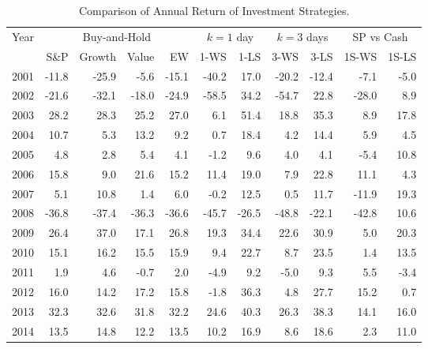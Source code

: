 \documentclass{article}
\begin{document}
\begin{table}[!ht]
    \centering
    \caption{Comparison of Annual Return of Investment Strategies.}
    \medskip
    \begin{tabular}{l | rrrr | rr | rr| rr}
    \hline
\multirow{2}{*}{Year} & \multicolumn{4}{c|}{Buy-and-Hold}   
& \multicolumn{2}{c|}{$k=1$  day}  & \multicolumn{2}{c}{$k=3$ days} & \multicolumn{2}{c}{SP vs Cash}  \\
  & S\&P & Growth & Value &EW & 1-WS & 1-LS & 3-WS & 3-LS & 1S-WS & 1S-LS \\ \hline
2001 & -11.8 & -25.9 & -5.6 & -15.1 & \cellcolor{red!25}-40.2 & \cellcolor{green!25}17.0 & -20.2 & -12.4 & -7.1 & -5.0 \\
2002 & -21.6 & -32.1 & -18.0 & -24.9 & \cellcolor{red!25}-58.5 & \cellcolor{green!25}34.2 & -54.7 & 22.8 & -28.0 & 8.9 \\
2003 & 28.2 & 28.3 & 25.2 & 27.0 & \cellcolor{red!25}6.1 & \cellcolor{green!25}51.4 & 18.8 & 35.3 & 8.9 & 17.8 \\
2004 & 10.7 & 5.3 & 13.2 & 9.2 & \cellcolor{red!25}0.7 & \cellcolor{green!25}18.4 & 4.2 & 14.4 & 5.9 & 4.5 \\
2005 & 4.8 & 2.8 & 5.4 & 4.1 & -1.2 & 9.6 & 4.0 & 4.1 & \cellcolor{red!25}-5.4 & \cellcolor{green!25}10.8 \\
2006 & 15.8 & 9.0 & 21.6 & 15.2 & 11.4 & 19.0 & 7.9 & \cellcolor{green!25}22.8 & 11.1 & \cellcolor{red!25}4.3 \\
2007 & 5.1 & 10.8 & 1.4 & 6.0 & -0.2 & 12.5 & 0.5 & 11.7 & \cellcolor{red!25}-11.9 & \cellcolor{green!25}19.3 \\
2008 & -36.8 & -37.4 & -36.3 & -36.6 & -45.7 & -26.5 & \cellcolor{red!25}-48.8 & -22.1 & -42.8 & \cellcolor{green!25}10.6 \\
2009 & 26.4 & \cellcolor{green!25}37.0 & 17.1 & 26.8 & 19.3 & 34.4 & 22.6 & 30.9 & \cellcolor{red!25}5.0 & 20.3 \\
2010 & 15.1 & 16.2 & 15.5 & 15.9 & 9.4 & 22.7 & 8.7 & \cellcolor{green!25}23.5 & \cellcolor{red!25}1.4 & 13.5 \\
2011 & 1.9 & 4.6 & -0.7 & 2.0 & -4.9 & 9.2 & \cellcolor{red!25}-5.0 & \cellcolor{green!25}9.3 & 5.5 & -3.4 \\
2012 & 16.0 & 14.2 & 17.2 & 15.8 & \cellcolor{red!25}-1.8 & \cellcolor{green!25}36.3 & 4.8 & 27.7 & 15.2 & 0.7 \\
2013 & 32.3 & 32.6 & 31.8 & 32.2 & 24.6 & \cellcolor{green!25}40.3 & 26.3 & 38.3 & \cellcolor{red!25}14.1 & 16.0 \\
2014 & 13.5 & 14.8 & 12.2 & 13.5 & 10.2 & 16.9 & 8.6 & \cellcolor{green!25}18.6 & \cellcolor{red!25}2.3 & 11.0 \\

\end{tabular}
\end{table}
\end{document}
